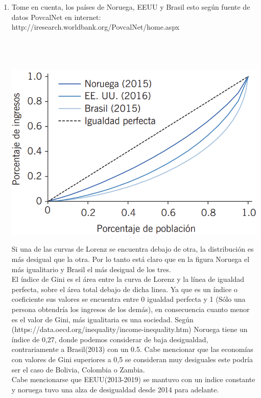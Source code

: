 \begin{enumerate}[\bfseries 1.]
    \item Tome en cuenta, los países de Noruega, EEUU y Brasil esto según fuente de datos PovcalNet en internet: http://iresearch.worldbank.org/PovcalNet/home.aspx\\\\  
	\begin{center}
	\\\\
	    \includegraphics[scale=.35]{codigoFuente/tareas/decisiones/image/gini.png}
	\end{center}
	\vspace{.7cm}
    Si una de las curvas de Lorenz se encuentra debajo de otra, la distribución  es más desigual que la otra. Por lo tanto está claro que en la figura Noruega el más igualitario y Brasil el más desigual de los tres.\\
    El índice de Gini es el área entre la curva de Lorenz y la línea de igualdad perfecta, sobre el área total debajo de dicha linea. Ya que es un índice o coeficiente sus valores se encuentra entre 0 igualdad perfecta y 1 (Sólo una persona obtendría los ingresos de los demás), en consecuencia cuanto menor es el valor de Gini, más igualitaria es una sociedad. 
    Según (https://data.oecd.org/inequality/income-inequality.htm) Noruega tiene un índice de 0,27, donde podemos considerar de baja desigualdad, contrariamente a Brasil(2013) con un 0.5. Cabe mencionar que las economías con valores de Gini superiores a 0,5 se consideran muy desiguales este podría ser el caso de Bolivia,  Colombia o Zambia. \\
    Cabe mencionarse que EEUU(2013-2019) se mantuvo con un indice constante y noruega tuvo una alza de desigualdad desde 2014 para adelante.\\\\ 


\end{enumerate}
